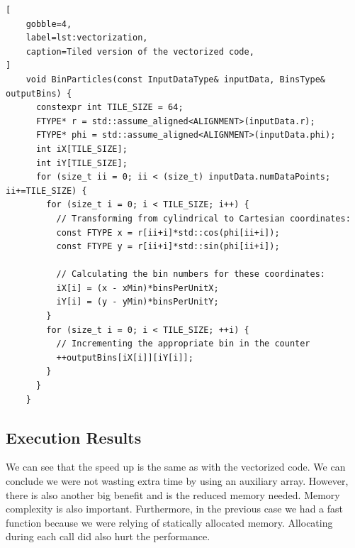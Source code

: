 \documentclass[
    12pt, %
]{fphw}
\begin{document}
\begin{lstlisting}[
    gobble=4,
    label=lst:vectorization,
    caption=Tiled version of the vectorized code,
]
    void BinParticles(const InputDataType& inputData, BinsType& outputBins) {
      constexpr int TILE_SIZE = 64;
      FTYPE* r = std::assume_aligned<ALIGNMENT>(inputData.r);
      FTYPE* phi = std::assume_aligned<ALIGNMENT>(inputData.phi);
      int iX[TILE_SIZE];
      int iY[TILE_SIZE];
      for (size_t ii = 0; ii < (size_t) inputData.numDataPoints; ii+=TILE_SIZE) {
        for (size_t i = 0; i < TILE_SIZE; i++) { 
          // Transforming from cylindrical to Cartesian coordinates:
          const FTYPE x = r[ii+i]*std::cos(phi[ii+i]);
          const FTYPE y = r[ii+i]*std::sin(phi[ii+i]);

          // Calculating the bin numbers for these coordinates:
          iX[i] = (x - xMin)*binsPerUnitX;
          iY[i] = (y - yMin)*binsPerUnitY;
        }
        for (size_t i = 0; i < TILE_SIZE; ++i) {
          // Incrementing the appropriate bin in the counter
          ++outputBins[iX[i]][iY[i]];
        }
      }
    }

\end{lstlisting}

\subsection{Execution Results}

    We can see that the speed up is the same as with the vectorized code.
We can conclude we were not wasting extra time by using an auxiliary array.
However, there is also another big benefit and is the reduced memory needed.
Memory complexity is also important.
Furthermore, in the previous case we had a fast function
because we were relying of statically allocated memory.
Allocating during each call did also hurt the performance.
\end{document}
